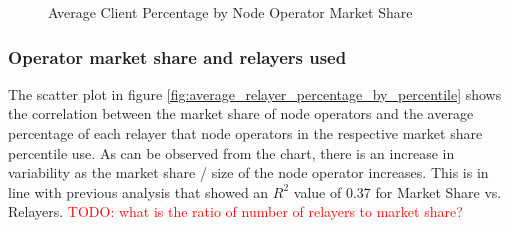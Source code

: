 \documentclass[conference]{IEEEtran}
\begin{document}
\begin{figure}[htbp]
  \centering
  \caption{Average Client Percentage by Node Operator Market Share}
  \label{fig:average_client_percentage_by_percentile}
\end{figure}


\subsubsection{Operator market share and relayers used}

The scatter plot in figure \ref{fig:average_relayer_percentage_by_percentile} shows the correlation between the market share of node operators and the average percentage of each relayer that node operators in the respective market share percentile use.  As can be observed from the chart, there is an increase in variability as the market share / size of the node operator increases.  This is in line with previous analysis that showed an $R^2$ value of 0.37 for Market Share vs. Relayers.  \textcolor{red}{TODO: what is the ratio of number of relayers to market share?}
\end{document}
